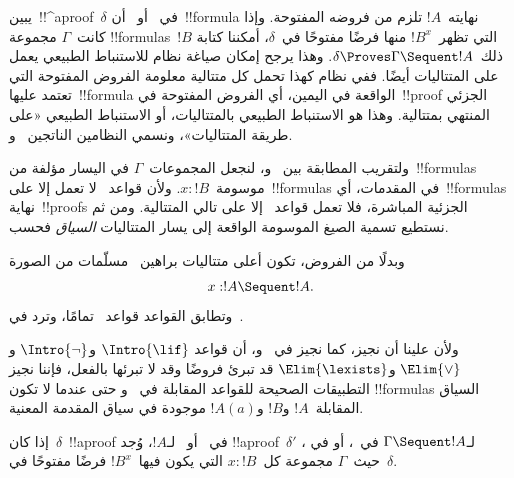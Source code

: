 \documentclass[../../../include/open-logic-section]{subfiles}
\begin{document}


يبين~!!^a{proof}~$\delta$ في~ أو~ أن~!!{formula}
نهايته~$!A$ تلزم من فروضه المفتوحة. وإذا كانت~$\Gamma$ مجموعة
!!{formula}s~$!B$ التي تظهر~$!B^x$ منها فرضًا مفتوحًا في~$\delta$،
أمكننا كتابة ذلك~$\delta \Proves \Gamma \Sequent !A$. وهذا يرجح إمكان
صياغة نظام للاستنباط الطبيعي يعمل على المتتاليات أيضًا. ففي نظام كهذا
تحمل كل متتالية معلومة الفروض المفتوحة التي تعتمد عليها~!!{formula}
الواقعة في اليمين، أي الفروض المفتوحة في~!!{proof} الجزئي المنتهي
بمتتالية. وهذا هو الاستنباط الطبيعي بالمتتاليات، أو الاستنباط الطبيعي
«على طريقة المتتاليات»، ونسمي النظامين الناتجين~ و.

ولتقريب المطابقة بين~ و، لنجعل المجموعات~$\Gamma$ في
اليسار مؤلفة من~!!{formula}s موسومة~$x:!B$. ولأن قواعد~ لا تعمل
إلا على~!!{formula}s في المقدمات، أي~!!{formula}s نهاية~!!{proof}s
الجزئية المباشرة، فلا تعمل قواعد~ إلا على تالي المتتالية. ومن ثم
نستطيع تسمية الصيغ الموسومة الواقعة إلى يسار المتتاليات \emph{السياق}
فحسب.

وبدلًا من الفروض، تكون أعلى متتاليات براهين~ مسلّمات من الصورة
\[x:!A \Sequent !A.\]
وتطابق القواعد قواعد~ تمامًا، وترد في~.



ولأن علينا أن نجيز، كما نجيز في~ و، أن قواعد
$\Intro{\lif}$ و$\Intro{\lnot}$ و$\Elim{\lor}$ و$\Elim{\lexists}$
قد تبرئ فروضًا وقد لا تبرئها بالفعل، فإننا نجيز التطبيقات الصحيحة
للقواعد المقابلة في~ و حتى عندما لا تكون
!!{formula}s السياق المقابلة~$!A$ و$!B$ و$!A(a)$ موجودة في سياق
المقدمة المعنية.

\begin{prop}
إذا كان~$\delta$~!!a{proof} في~ أو~ لـ$!A$، وُجد
!!a{proof}~$\delta'$ لـ$\Gamma \Sequent !A$ في~، أو في
، حيث~$\Gamma$ مجموعة كل~$x:!B$ التي يكون فيها~$!B^x$ فرضًا
مفتوحًا في~$\delta$.
\end{prop}
\end{document}
